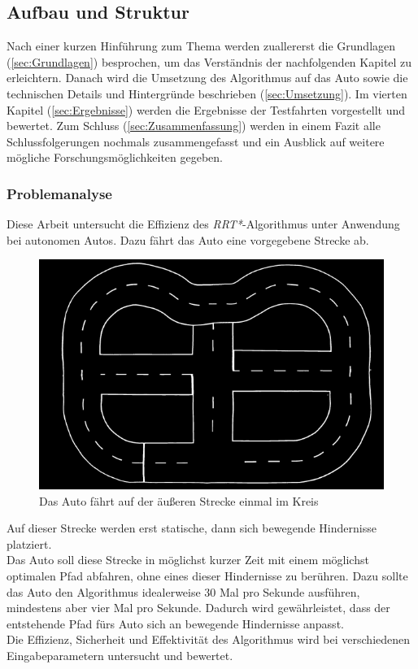 \subsection{Aufbau und Struktur}
Nach einer kurzen Hinführung zum Thema werden zuallererst die Grundlagen (\ref{sec:Grundlagen}) besprochen, um das Verständnis der nachfolgenden Kapitel zu erleichtern. Danach wird die Umsetzung des Algorithmus auf das Auto sowie die technischen Details und Hintergründe beschrieben (\ref{sec:Umsetzung}). Im vierten Kapitel (\ref{sec:Ergebnisse}) werden die Ergebnisse der Testfahrten vorgestellt und bewertet. Zum Schluss (\ref{sec:Zusammenfassung}) werden in einem Fazit alle Schlussfolgerungen nochmals zusammengefasst und ein Ausblick auf weitere mögliche Forschungsmöglichkeiten gegeben. \\ 
\subsubsection{Problemanalyse}
Diese Arbeit untersucht die Effizienz des\textit{ RRT*}-Algorithmus unter Anwendung bei autonomen Autos. Dazu fährt das Auto eine vorgegebene Strecke ab.
\begin{figure}
\centering
\includegraphics[scale=0.5]{Bilder/fu_robotics_lab_map_600x400.png} 
\caption{Das Auto fährt auf der äußeren Strecke einmal im Kreis}
\end{figure}
 Auf dieser Strecke werden erst statische, dann sich bewegende Hindernisse platziert. \\
Das Auto soll diese Strecke in möglichst kurzer Zeit mit einem möglichst optimalen Pfad abfahren, ohne eines dieser Hindernisse zu berühren. Dazu sollte das Auto den Algorithmus idealerweise 30 Mal pro Sekunde ausführen, mindestens aber vier Mal pro Sekunde. Dadurch wird gewährleistet, dass der entstehende Pfad fürs Auto sich an bewegende Hindernisse anpasst. \\
Die Effizienz, Sicherheit und Effektivität des Algorithmus wird bei verschiedenen Eingabeparametern untersucht und bewertet. \\

